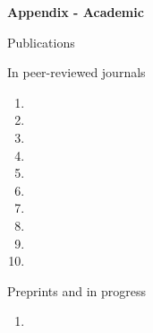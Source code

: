 \hfil{\Large{\bf Appendix - Academic}}\hfil\\
\nameskip\break


\begin{rSection}{Publications}
\begin{rSubsection}{In peer-reviewed journals}{}{}{}
  \begin{NoHyper}
  \begin{enumerate}
    \item {}
    \item {}
    \item {}
    \item {}
    \item {}
    \item {}
    \item {}
    \item {}
    \item {}
    \item {}
  \end{enumerate}
  \end{NoHyper}
\end{rSubsection}

\begin{rSubsection}{Preprints and in progress}{}{}{}
  \begin{NoHyper}
  \begin{enumerate}
    \item {}
  \end{enumerate}
  \end{NoHyper}
\end{rSubsection}
\end{rSection}

